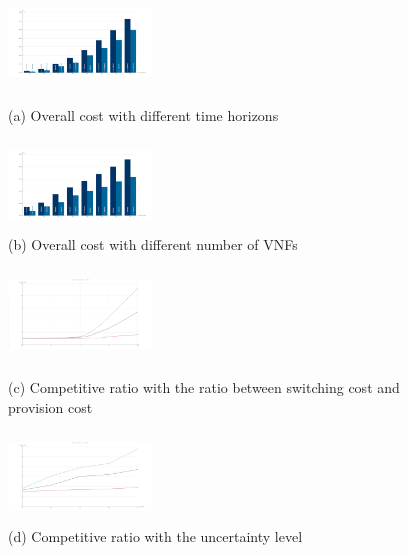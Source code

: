 \documentclass{acmtog}
\begin{document}
\begin{figure}[!h]
    \begin{minipage}[t]{0.5\linewidth}
    \centering
    \includegraphics[height=2.4cm,width=3.8cm]{9.png}
    \caption*{(a) Overall cost with different time horizons}
    \label{fig:Overall cost with different time horizons}
    \end{minipage}
    \begin{minipage}[t]{0.5\linewidth}
    \centering
    \includegraphics[height=2.4cm,width=3.8cm]{10.png}
    \caption*{(b) Overall cost with different number of VNFs}
    \label{fig:Overall cost with different number of VNFs}
    \end{minipage} 
\end{figure}

\begin{figure}[!h]
    \begin{minipage}[t]{0.5\linewidth}
    \centering
    \includegraphics[height=2.4cm,width=3.8cm]{11.png}
    \caption*{(c) Competitive ratio with the ratio between switching cost and provision cost}
    \label{fig:Competitive ratio with the ratio between switching cost and provision cost}
    \end{minipage}
    \begin{minipage}[t]{0.5\linewidth}
    \centering
    \includegraphics[height=2.4cm,width=3.8cm]{12.png}
    \caption*{(d) Competitive ratio with the uncertainty level}
    \label{fig:Competitive ratio with the uncertainty level}
    \end{minipage}
\end{figure}
\end{document}
